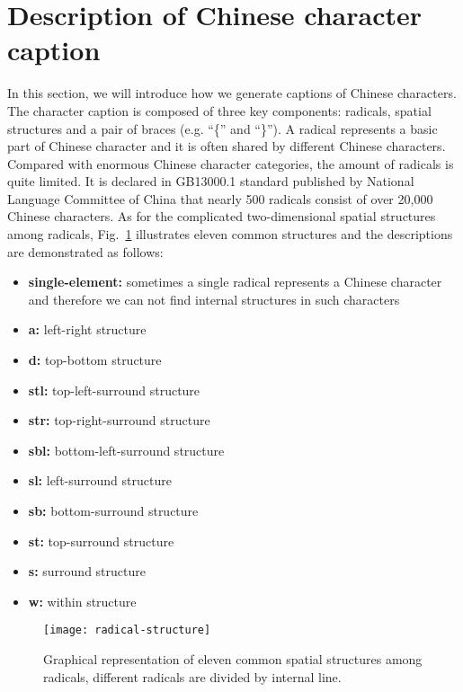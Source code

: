 \documentclass[a4paper,conference]{IEEEtran}
\begin{document}
\section{Description of Chinese character caption}
\label{sec:Description of Chinese character caption}
In this section, we will introduce how we generate captions of Chinese characters. The character caption is composed of three key components: radicals, spatial structures and a pair of braces (e.g. ``\{'' and ``\}''). A radical represents a basic part of Chinese character and it is often shared by different Chinese characters. Compared with enormous Chinese character categories, the amount of radicals is quite limited. It is declared in GB13000.1 standard published by National Language Committee of China that nearly 500 radicals consist of over 20,000 Chinese characters. As for the complicated two-dimensional spatial structures among radicals, Fig.~\ref{fig:radical-structure} illustrates eleven common structures and the descriptions are demonstrated as follows:
\begin{itemize}
  \item \textbf{single-element:} sometimes a single radical represents a Chinese character and therefore we can not find internal structures in such characters
  \item \textbf{a:} left-right structure
  \item \textbf{d:} top-bottom structure
  \item \textbf{stl:} top-left-surround structure
  \item \textbf{str:} top-right-surround structure
  \item \textbf{sbl:} bottom-left-surround structure
  \item \textbf{sl:} left-surround structure
  \item \textbf{sb:} bottom-surround structure
  \item \textbf{st:} top-surround structure
  \item \textbf{s:} surround structure
  \item \textbf{w:} within structure
\end{itemize}

\begin{figure}
\centering
\texttt{[image: radical-structure]}
\caption{Graphical representation of eleven common spatial structures among radicals, different radicals are divided by internal line.}
\label{fig:radical-structure}
\end{figure}
\end{document}
